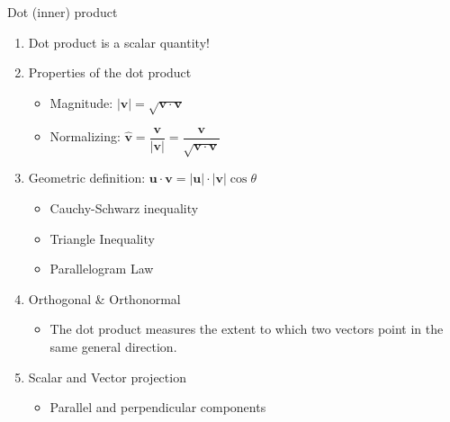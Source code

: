 \documentclass{beamer}
\begin{document}
\begin{frame}[allowframebreaks]{Dot  (inner) product}
	\begin{enumerate}
		\item Dot product is a \alert{scalar} quantity!
		
		
		\item Properties of the dot product
		\begin{itemize}
			\item Magnitude: $|\mathbf{v}| = \sqrt{\mathbf{v}\cdot\mathbf{v}}$
			\item Normalizing: $\hat{\mathbf{v}} = \dfrac{\mathbf{v}}{|\mathbf{v}|} = \dfrac{\mathbf{v}}{\sqrt{\mathbf{v}\cdot\mathbf{v}}}$
			
		\end{itemize}
		
		\item Geometric definition: $\mathbf{u}\cdot\mathbf{v} = |\mathbf{u}|\cdot|\mathbf{v}|\cos\theta$
		\begin{itemize}
			\item Cauchy-Schwarz inequality
			\item Triangle Inequality
			\item Parallelogram Law
		\end{itemize}
		\item Orthogonal \& Orthonormal
		\begin{itemize}
			\item \alert{The dot product measures the extent to which two vectors point in
				the same general direction.}
		\end{itemize}
		
		\item Scalar and Vector projection
		\begin{itemize}
			\item Parallel and perpendicular components
		\end{itemize}
	\end{enumerate}
	
	
\end{frame}
\end{document}
